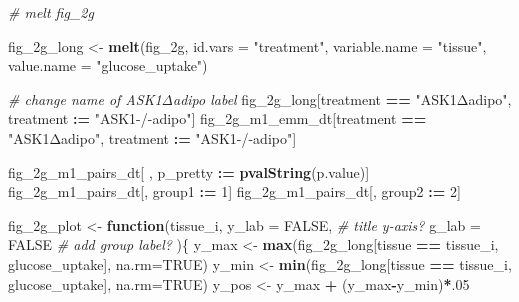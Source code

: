\documentclass[]{book}
\newenvironment{Shaded}{\begin{snugshade}}{\end{snugshade}}
\newcommand{\CommentTok}[1]{\textcolor[rgb]{0.56,0.35,0.01}{\textit{#1}}}
\newcommand{\ControlFlowTok}[1]{\textcolor[rgb]{0.13,0.29,0.53}{\textbf{#1}}}
\newcommand{\DataTypeTok}[1]{\textcolor[rgb]{0.13,0.29,0.53}{#1}}
\newcommand{\DecValTok}[1]{\textcolor[rgb]{0.00,0.00,0.81}{#1}}
\newcommand{\ErrorTok}[1]{\textcolor[rgb]{0.64,0.00,0.00}{\textbf{#1}}}
\newcommand{\KeywordTok}[1]{\textcolor[rgb]{0.13,0.29,0.53}{\textbf{#1}}}
\newcommand{\NormalTok}[1]{#1}
\newcommand{\OperatorTok}[1]{\textcolor[rgb]{0.81,0.36,0.00}{\textbf{#1}}}
\newcommand{\OtherTok}[1]{\textcolor[rgb]{0.56,0.35,0.01}{#1}}
\newcommand{\StringTok}[1]{\textcolor[rgb]{0.31,0.60,0.02}{#1}}
\begin{document}
\begin{Shaded}
\begin{Highlighting}[]
\CommentTok{# melt fig_2g}

\NormalTok{fig_2g_long <-}\StringTok{ }\KeywordTok{melt}\NormalTok{(fig_2g,}
                    \DataTypeTok{id.vars =} \StringTok{"treatment"}\NormalTok{,}
                    \DataTypeTok{variable.name =} \StringTok{"tissue"}\NormalTok{,}
                    \DataTypeTok{value.name =} \StringTok{"glucose_uptake"}\NormalTok{)}

\CommentTok{# change name of ASK1Δadipo label}
\NormalTok{fig_2g_long[treatment }\OperatorTok{==}\StringTok{ "ASK1Δadipo"}\NormalTok{, treatment }\OperatorTok{:}\ErrorTok{=}\StringTok{ "ASK1-/-adipo"}\NormalTok{]}
\NormalTok{fig_2g_m1_emm_dt[treatment }\OperatorTok{==}\StringTok{ "ASK1Δadipo"}\NormalTok{, treatment }\OperatorTok{:}\ErrorTok{=}\StringTok{ "ASK1-/-adipo"}\NormalTok{]}

\NormalTok{fig_2g_m1_pairs_dt[ , p_pretty }\OperatorTok{:}\ErrorTok{=}\StringTok{ }\KeywordTok{pvalString}\NormalTok{(p.value)]}
\NormalTok{fig_2g_m1_pairs_dt[, group1 }\OperatorTok{:}\ErrorTok{=}\StringTok{ }\DecValTok{1}\NormalTok{]}
\NormalTok{fig_2g_m1_pairs_dt[, group2 }\OperatorTok{:}\ErrorTok{=}\StringTok{ }\DecValTok{2}\NormalTok{]}

\NormalTok{fig_2g_plot <-}\StringTok{ }\ControlFlowTok{function}\NormalTok{(tissue_i,}
                        \DataTypeTok{y_lab =} \OtherTok{FALSE}\NormalTok{, }\CommentTok{# title y-axis?}
                        \DataTypeTok{g_lab =} \OtherTok{FALSE}  \CommentTok{# add group label?}
\NormalTok{                        )\{}
\NormalTok{  y_max <-}\StringTok{ }\KeywordTok{max}\NormalTok{(fig_2g_long[tissue }\OperatorTok{==}\StringTok{ }\NormalTok{tissue_i, glucose_uptake], }\DataTypeTok{na.rm=}\OtherTok{TRUE}\NormalTok{)}
\NormalTok{  y_min <-}\StringTok{ }\KeywordTok{min}\NormalTok{(fig_2g_long[tissue }\OperatorTok{==}\StringTok{ }\NormalTok{tissue_i, glucose_uptake], }\DataTypeTok{na.rm=}\OtherTok{TRUE}\NormalTok{)}
\NormalTok{  y_pos <-}\StringTok{ }\NormalTok{y_max }\OperatorTok{+}\StringTok{ }\NormalTok{(y_max}\OperatorTok{-}\NormalTok{y_min)}\OperatorTok{*}\NormalTok{.}\DecValTok{05}
  

\end{Highlighting}
\end{Shaded}
\end{document}
